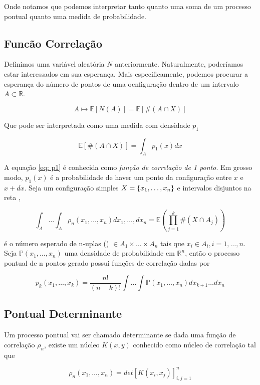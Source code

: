 Onde notamos que podemos interpretar tanto quanto uma soma de um processo pontual quanto uma medida de probabilidade.


\subsection{Funcão Correlação}

Definimos uma variável aleatória $N$ anteriormente. Naturalmente, poderíamos estar interessados em sua esperança. Mais especificamente, podemos procurar a esperança do número de pontos de uma ocnfiguração dentro de um intervalo $A \subset \mathbb{R}$.

\[
	A \mapsto \mathbb{E}[N(A)] = \mathbb{E}[\#(A \cap X)]	
\]

Que pode ser interpretada como uma medida com densidade $p_1$

\begin{equation}
	\mathbb{E}[\#(A \cap X)] = \int_{A} p_1(x) dx
	\label{eq: p1}
\end{equation}

A equação \ref{eq: p1} é conhecida como \textit{função de correlação de 1 ponto}. Em grosso modo, $p_1(x)$ é a probabilidade de haver um ponto da configuração entre $x$ e $x+dx$. Seja um configuração simples $X = \{x_1, \dots, x_n\}$ e intervalos disjuntos na reta ,

\[
	\int_A \dots \int_A \rho_n(x_1, \dots, x_n) dx_1, \dots, dx_n = \mathbb{E} \left( \prod_{j=1}^{k} \# (X \cap A_j) \right) 
\]

é o número esperado de n-uplas () $\in A_1 \times \dots \times A_n$ tais que $x_i \in A_i, i=1,\dots,n$. Seja $\mathbb{P}(x_1, \dots, x_n)$ uma densidade de probabilidade em $\mathbb{R}^n$, então o processo pontual de n pontos gerado possui funções de correlação dadas por

\[
	p_k(x_1, \dots, x_k) = \frac{n!}{(n-k)!} \int \dots \int \mathbb{P}(x_1, \dots, x_n) dx_{k+1}\dots dx_n
\]


\subsection{Pontual Determinante}

Um processo pontual vai ser chamado determinante se dada uma função de correlação $\rho_n$, existe um núcleo $K(x, y)$ conhecido como núcleo de correlação tal que

\begin{equation}
	\rho_n(x_1, \dots, x_n) = det[K(x_i, x_j)]_{i,j=1}^{n}
	\label{eq: pontualdet}
\end{equation}

